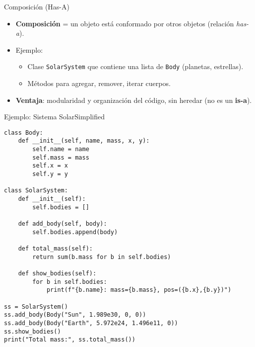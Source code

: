 \documentclass[10pt]{beamer}
\begin{document}
\begin{frame}{Composición (Has-A)}
  \begin{itemize}
    \item \textbf{Composición} = un objeto está conformado por otros objetos (relación \emph{has-a}).
    \item Ejemplo:
      \begin{itemize}
        \item Clase \texttt{SolarSystem} que contiene una lista de \texttt{Body} (planetas, estrellas).
        \item Métodos para agregar, remover, iterar cuerpos.
      \end{itemize}
    \item \textbf{Ventaja}: modularidad y organización del código, sin heredar (no es un \textbf{is-a}).
  \end{itemize}
\end{frame}

\begin{frame}[fragile]{Ejemplo: Sistema SolarSimplified}
\begin{verbatim}
class Body:
    def __init__(self, name, mass, x, y):
        self.name = name
        self.mass = mass
        self.x = x
        self.y = y

class SolarSystem:
    def __init__(self):
        self.bodies = []

    def add_body(self, body):
        self.bodies.append(body)

    def total_mass(self):
        return sum(b.mass for b in self.bodies)

    def show_bodies(self):
        for b in self.bodies:
            print(f"{b.name}: mass={b.mass}, pos=({b.x},{b.y})")

ss = SolarSystem()
ss.add_body(Body("Sun", 1.989e30, 0, 0))
ss.add_body(Body("Earth", 5.972e24, 1.496e11, 0))
ss.show_bodies()
print("Total mass:", ss.total_mass())
\end{verbatim}
\end{frame}

\end{document}
